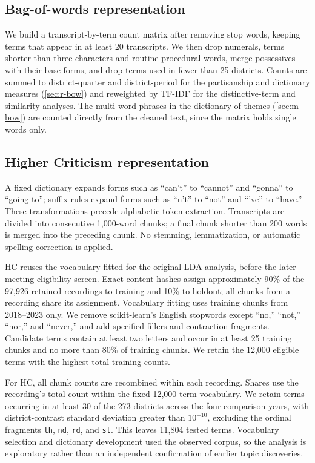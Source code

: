 \subsection{Bag-of-words representation}
We build a transcript-by-term count matrix after removing stop words, keeping
terms that appear in at least 20 transcripts. We then drop numerals, terms shorter
than three characters and routine procedural words, merge possessives with their
base forms, and drop terms used in fewer than 25 districts. Counts are summed to
district-quarter and district-period for the partisanship and dictionary measures
(\cref{sec:r-bow}) and reweighted by TF-IDF for the distinctive-term and similarity
analyses. The multi-word phrases in the dictionary of themes (\cref{sec:m-bow}) are
counted directly from the cleaned text, since the matrix holds single words only.

\subsection{Higher Criticism representation}

A fixed dictionary expands forms such as ``can't'' to
``cannot'' and ``gonna'' to ``going to''; suffix rules expand
forms such as ``n't'' to ``not'' and ``'ve'' to ``have.''
These transformations precede alphabetic token extraction.
Transcripts are divided into consecutive 1,000-word chunks;
a final chunk shorter than 200 words is merged into the
preceding chunk. No stemming, lemmatization, or automatic
spelling correction is applied.

HC reuses the vocabulary fitted for the original LDA analysis,
before the later meeting-eligibility screen. Exact-content
hashes assign approximately 90\% of the 97,926 retained
recordings to training and 10\% to holdout; all chunks from
a recording share its assignment. Vocabulary fitting uses
training chunks from 2018--2023 only. We remove scikit-learn's
English stopwords except ``no,'' ``not,'' ``nor,'' and
``never,'' and add specified fillers and contraction fragments.
Candidate terms contain at least two letters and occur in
at least 25 training chunks and no more than 80\% of training
chunks. We retain the 12,000 eligible terms with the highest
total training counts.

For HC, all chunk counts are recombined within each recording.
Shares use the recording's total count within the fixed
12,000-term vocabulary. We retain terms occurring in at least
30 of the 273 districts across the four comparison years,
with district-contrast standard deviation greater than
$10^{-10}$, excluding the ordinal fragments
\texttt{th}, \texttt{nd}, \texttt{rd}, and \texttt{st}.
This leaves 11,804 tested terms. Vocabulary selection and
dictionary development used the observed corpus, so the
analysis is exploratory rather than an independent
confirmation of earlier topic discoveries.

